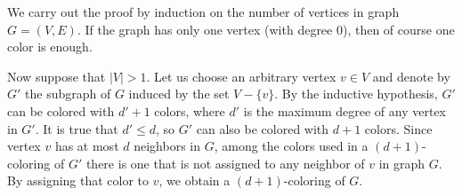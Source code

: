 We carry out the proof by induction on the number of vertices in graph $G=(V,E)$.
If the graph has only one vertex (with degree 0), then of course one color is enough.

Now suppose that $|V|>1$.
Let us choose an arbitrary vertex $v\in V$ and denote by $G'$ the subgraph of $G$ induced by the set $V-\{v\}$.
By the inductive hypothesis, $G'$ can be colored with $d'+1$ colors, where $d'$ is the maximum degree of any vertex in $G'$.
It is true that $d'\le d$, so $G'$ can also be colored with $d+1$ colors.
Since vertex $v$ has at most $d$ neighbors in $G$, among the colors used in a
$(d+1)$-coloring of $G'$ there is one that is not assigned to any neighbor of $v$ in graph $G$.
By assigning that color to $v$, we obtain a $(d+1)$-coloring of $G$.

